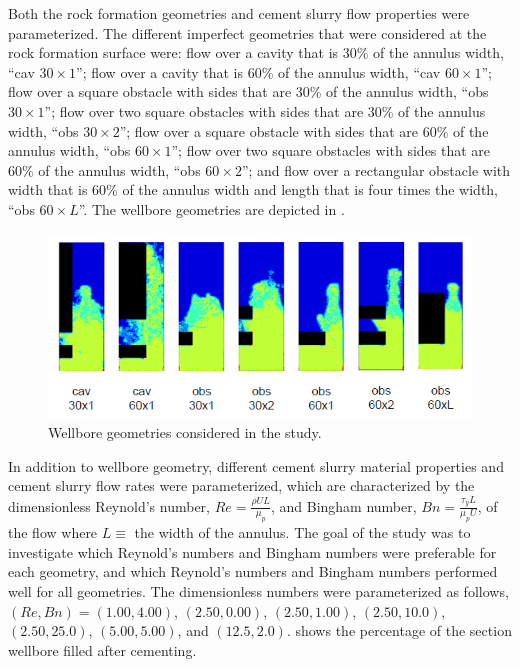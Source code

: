 \documentclass[pdftex,ms]{pittetd}
\begin{document}
Both the rock formation geometries and cement slurry flow properties were parameterized.
The different imperfect geometries that were considered at the rock formation surface were: flow over a cavity that is 30\% of the annulus width, ``cav $30 \times 1$''; flow over a cavity that is 60\% of the annulus width, ``cav $60 \times 1$''; flow over a square obstacle with sides that are 30\% of the annulus width, ``obs $30 \times 1$''; flow over two square obstacles with sides that are 30\% of the annulus width, ``obs $30 \times 2$''; flow over a square obstacle with sides that are 60\% of the annulus width, ``obs $60 \times 1$''; flow over two square obstacles with sides that are 60\% of the annulus width, ``obs $60 \times 2$''; and flow over a rectangular obstacle with width that is 60\% of the annulus width and length that is four times the width, ``obs $60 \times L$''.
The wellbore geometries are depicted in .

\begin{figure}
\includegraphics[width=\linewidth]{figs/wellbore-geometries}
\caption{Wellbore geometries considered in the study.}
\label{fig:wellbore-geometries}
\end{figure}

In addition to wellbore geometry, different cement slurry material properties and cement slurry flow rates were parameterized, which are characterized by the dimensionless Reynold's number, $Re = \frac{\rho U L}{\mu_p}$, and Bingham number, $Bn = \frac{\tau_y L}{\mu_p U}$, of the flow where $L \equiv $ the width of the annulus.
The goal of the study was to investigate which Reynold's numbers and Bingham numbers were preferable for each geometry, and which Reynold's numbers and Bingham numbers performed well for all geometries.
The dimensionless numbers were parameterized as follows, $(Re, Bn) = (1.00, 4.00)$,  $(2.50, 0.00)$, $(2.50, 1.00)$, $(2.50, 10.0)$, $(2.50, 25.0)$, $(5.00, 5.00)$, and $(12.5, 2.0)$.
 shows the percentage of the \anh \hspace{0.05cm} section wellbore filled after cementing.
\end{document}
